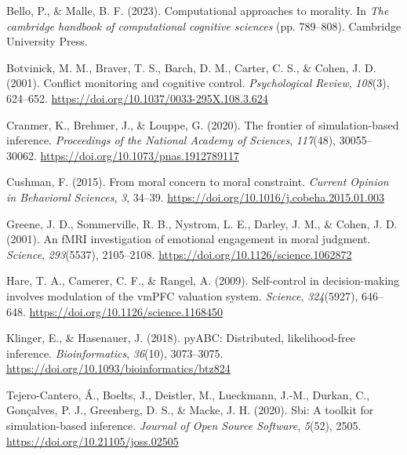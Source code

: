 \documentclass[
  11pt,
]{article}
\newlength{\cslhangindent}
\newenvironment{CSLReferences}[2] %
 {\begin{list}{}{%
  \setlength{\itemindent}{0pt}
  \setlength{\leftmargin}{0pt}
  \setlength{\parsep}{0pt}
  \ifodd #1
   \setlength{\leftmargin}{\cslhangindent}
   \setlength{\itemindent}{-1\cslhangindent}
  \fi
  \setlength{\itemsep}{#2\baselineskip}}}
 {\end{list}}
\begin{document}
\protect{}\label{refs}
\begin{CSLReferences}{1}{0}
Bello, P., \& Malle, B. F. (2023). Computational approaches to morality.
In \emph{The cambridge handbook of computational cognitive sciences}
(pp. 789--808). Cambridge University Press.

Botvinick, M. M., Braver, T. S., Barch, D. M., Carter, C. S., \& Cohen,
J. D. (2001). Conflict monitoring and cognitive control.
\emph{Psychological Review}, \emph{108}(3), 624--652.
\url{https://doi.org/10.1037/0033-295X.108.3.624}

Cranmer, K., Brehmer, J., \& Louppe, G. (2020). The frontier of
simulation-based inference. \emph{Proceedings of the National Academy of
Sciences}, \emph{117}(48), 30055--30062.
\url{https://doi.org/10.1073/pnas.1912789117}

Cushman, F. (2015). From moral concern to moral constraint.
\emph{Current Opinion in Behavioral Sciences}, \emph{3}, 34--39.
\url{https://doi.org/10.1016/j.cobeha.2015.01.003}

Greene, J. D., Sommerville, R. B., Nystrom, L. E., Darley, J. M., \&
Cohen, J. D. (2001). An fMRI investigation of emotional engagement in
moral judgment. \emph{Science}, \emph{293}(5537), 2105--2108.
\url{https://doi.org/10.1126/science.1062872}

Hare, T. A., Camerer, C. F., \& Rangel, A. (2009). Self-control in
decision-making involves modulation of the vmPFC valuation system.
\emph{Science}, \emph{324}(5927), 646--648.
\url{https://doi.org/10.1126/science.1168450}

Klinger, E., \& Hasenauer, J. (2018). pyABC: Distributed,
likelihood-free inference. \emph{Bioinformatics}, \emph{36}(10),
3073--3075. \url{https://doi.org/10.1093/bioinformatics/btz824}

Tejero-Cantero, Á., Boelts, J., Deistler, M., Lueckmann, J.-M., Durkan,
C., Gonçalves, P. J., Greenberg, D. S., \& Macke, J. H. (2020). Sbi: A
toolkit for simulation-based inference. \emph{Journal of Open Source
Software}, \emph{5}(52), 2505. \url{https://doi.org/10.21105/joss.02505}

\end{CSLReferences}
\end{document}

